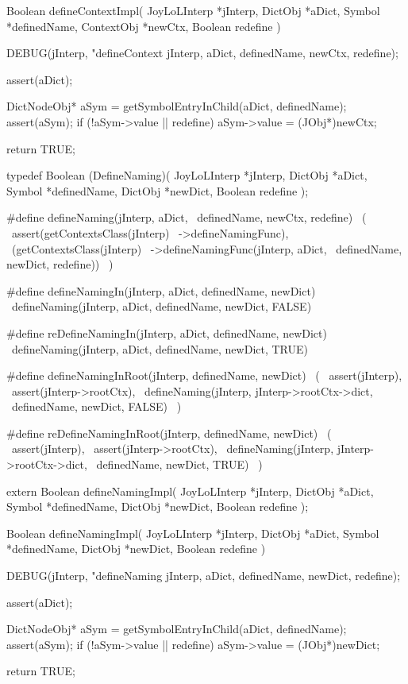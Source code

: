 \startCCode
Boolean defineContextImpl(
  JoyLoLInterp *jInterp,
  DictObj      *aDict,
  Symbol       *definedName,
  ContextObj   *newCtx,
  Boolean       redefine
) {
  DEBUG(jInterp, "defineContext %
        jInterp, aDict, definedName, newCtx, redefine);

  assert(aDict);
  
  DictNodeObj* aSym = getSymbolEntryInChild(aDict, definedName);
  assert(aSym);
  if (!aSym->value || redefine) {
    aSym->value   = (JObj*)newCtx;
  }

  return TRUE;
}
\stopCCode

\startCHeader
typedef Boolean (DefineNaming)(
  JoyLoLInterp *jInterp,
  DictObj      *aDict,
  Symbol       *definedName,
  DictObj      *newDict,
  Boolean       redefine
);

#define defineNaming(jInterp, aDict,      \
  definedName, newCtx, redefine)          \
  (                                       \
    assert(getContextsClass(jInterp)      \
      ->defineNamingFunc),                \
    (getContextsClass(jInterp)            \
      ->defineNamingFunc(jInterp, aDict,  \
        definedName, newDict, redefine))  \
  )

#define defineNamingIn(jInterp, aDict, definedName, newDict)  \
  defineNaming(jInterp, aDict, definedName, newDict, FALSE)

#define reDefineNamingIn(jInterp, aDict, definedName, newDict)  \
  defineNaming(jInterp, aDict, definedName, newDict, TRUE)

#define defineNamingInRoot(jInterp, definedName, newDict) \
  (                                                       \
    assert(jInterp),                                      \
    assert(jInterp->rootCtx),                             \
    defineNaming(jInterp, jInterp->rootCtx->dict,         \
      definedName, newDict, FALSE)                        \
  )

#define reDefineNamingInRoot(jInterp, definedName, newDict) \
  (                                                         \
    assert(jInterp),                                        \
    assert(jInterp->rootCtx),                               \
    defineNaming(jInterp, jInterp->rootCtx->dict,           \
      definedName, newDict, TRUE)                           \
  )
\stopCHeader

\setCHeaderStream{private}
\startCHeader
extern Boolean defineNamingImpl(
  JoyLoLInterp *jInterp,
  DictObj      *aDict,
  Symbol       *definedName,
  DictObj      *newDict,
  Boolean       redefine
);
\stopCHeader
\setCHeaderStream{public}

\startCCode
Boolean defineNamingImpl(
  JoyLoLInterp *jInterp,
  DictObj      *aDict,
  Symbol       *definedName,
  DictObj      *newDict,
  Boolean       redefine
) {
  DEBUG(jInterp, "defineNaming %
        jInterp, aDict, definedName, newDict, redefine);

  assert(aDict);
  
  DictNodeObj* aSym = getSymbolEntryInChild(aDict, definedName);
  assert(aSym);
  if (!aSym->value || redefine) {
    aSym->value   = (JObj*)newDict;
  }

  return TRUE;
}
\stopCCode
